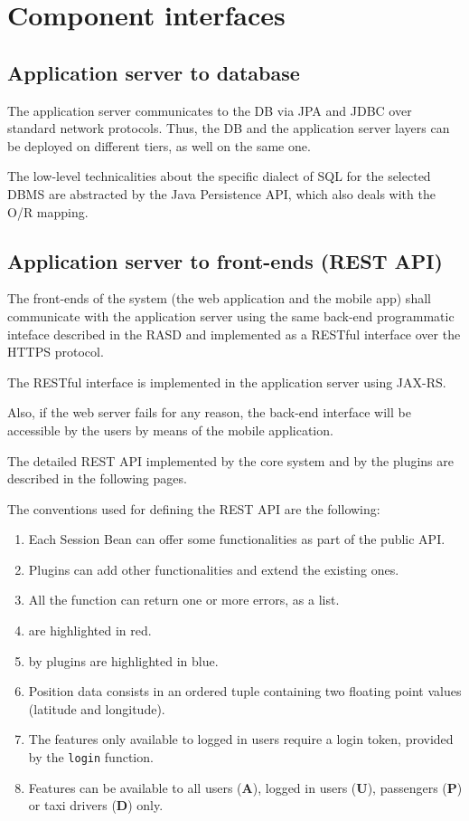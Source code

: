 \section{Component interfaces}
\label{sec:component-interfaces}

\subsection{Application server to database}
The application server communicates to the DB via JPA and JDBC over standard network protocols. Thus, the DB and the application server layers can be deployed on different tiers, as well on the same one.

The low-level technicalities about the specific dialect of SQL for the selected DBMS are abstracted by the Java Persistence API, which also deals with the O/R mapping.

\subsection{Application server to front-ends (REST API)}
\label{sec:rest-api}
The front-ends of the system (the web application and the mobile app) shall communicate with the application server using the same back-end programmatic inteface described in the RASD and implemented as a RESTful interface over the HTTPS protocol.

The RESTful interface is implemented in the application server using JAX-RS.

Also, if the web server fails for any reason, the back-end interface will be accessible by the users by means of the mobile application.

The detailed REST API implemented by the core system and by the plugins are described in the following pages.

The conventions used for defining the REST API are the following:
\begin{enumerate}
    \item Each Session Bean can offer some functionalities as part of the public API.
    \item Plugins can add other functionalities and extend the existing ones.
    \item All the function can return one or more errors, as a list.
    \item {} are highlighted in red.
    \item {} by plugins are highlighted in blue.
    \item Position data consists in an ordered tuple containing two floating point values (latitude and longitude).
    \item The features only available to logged in users require a login token, provided by the \texttt{login} function.
    \item Features can be available to all users (\textbf{A}), logged in users (\textbf{U}), passengers (\textbf{P}) or taxi drivers (\textbf{D}) only.
\end{enumerate}

